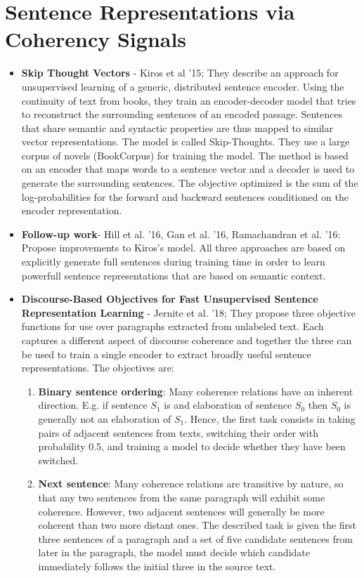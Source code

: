 \section{Sentence Representations via Coherency Signals}
\begin{itemize}

\item \textbf{Skip Thought Vectors} - Kiros et al '15; They describe an approach for unsupervised learning of a generic, distributed sentence encoder. Using the continuity of text from books, they train an encoder-decoder model that tries to reconstruct the surrounding sentences of an encoded passage. Sentences that share semantic and syntactic properties are thus mapped to similar vector representations. The model is called Skip-Thoughts. They use a large corpus of novels (BookCorpus) for training the model. The method is based on an encoder that maps words to a sentence vector and a decoder is used to generate the surrounding sentences. The objective optimized is the sum of the log-probabilities
for the forward and backward sentences conditioned on the encoder representation.

\item \textbf{Follow-up work}-  Hill et al. '16,  Gan et al. '16, Ramachandran et al. '16: Propose improvements to Kiros's model. All three approaches are based on explicitly generate full sentences during training time in order to learn powerfull sentence representations that are based on semantic context.

\item \textbf{Discourse-Based Objectives
for Fast Unsupervised Sentence Representation Learning} - Jernite et al. '18; They propose three objective functions for use over paragraphs extracted from unlabeled text. Each captures a different aspect of discourse coherence and together the three can be used to train a single encoder to extract broadly useful sentence representations. The objectives are:
\begin{enumerate}
\item \textbf{Binary sentence ordering}: Many coherence relations have an inherent direction. E.g. if sentence $S_1$ is and elaboration of sentence $S_0$ then $S_0$ is generally not an elaboration of $S_1$. Hence, the first task consists in taking pairs of adjacent sentences from texts, switching their order with probability 0.5,
and training a model to decide whether they have been switched.

\item \textbf{Next sentence}: Many coherence relations are transitive by nature, so that any two sentences from the same paragraph will exhibit some coherence. However, two adjacent sentences will generally be more coherent than two more distant ones. The described task is  given the first three sentences of a paragraph and a set of five candidate sentences from later in the paragraph, the model must decide which candidate immediately follows the initial three in the source text. 


\end{enumerate}
\end{itemize}
